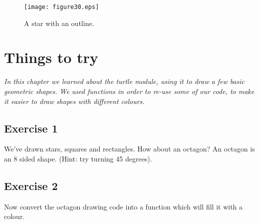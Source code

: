 \begin{figure}
\begin{center}
\texttt{[image: figure30.eps]}
\end{center}
\caption{A star with an outline.}\label{fig30}
\end{figure}

\section{Things to try}

\emph{In this chapter we learned about the turtle module, using it to draw a few basic geometric shapes. We used functions in order to re-use some of our code, to make it easier to draw shapes with different colours.}

\subsection*{Exercise 1}
We've drawn stars, squares and rectangles.  How about an octagon?  An octagon is an 8 sided shape.
(Hint: try turning 45 degrees).

\subsection*{Exercise 2}
Now convert the octagon drawing code into a function which will fill it with a colour.

\newpage